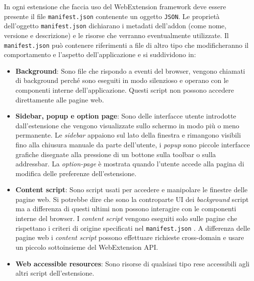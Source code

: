 \documentclass{sapthesis}
\newcommand{\bold}[1]{\textbf{#1}}
\newcommand{\code}[1]{\texttt{#1}}
\newcommand{\manifest}{\code{manifest.json} }
\begin{document}
        In ogni estensione che faccia uso del WebExtension framework deve essere presente il file \manifest contenente 
        un oggetto \code{JSON}. Le proprietà dell'oggetto \manifest dichiarano i metadati dell'addon (come nome, 
        versione e descrizione) e le risorse che verranno eventualmente utilizzate.
        Il \manifest può contenere riferimenti a file di altro tipo che modificheranno il comportamento e l'aspetto
        dell'applicazione e si suddividono in:
        \begin{itemize}
            \item \bold{Background}: Sono file che rispondo a eventi del browser, vengono chiamati di background 
                    perché sono eseguiti in modo silenzioso e operano con le componenti interne dell'applicazione.
                    Questi script non possono accedere direttamente alle pagine web.

            \item \bold{Sidebar, popup e option page}: Sono delle interfacce utente introdotte dall'estensione che
                    vengono visualizzate sullo schermo in modo più o meno permanente. Le \textit{sidebar} appaiono sul lato
                    della finestra e rimangono visibili fino alla chiusura manuale da parte dell'utente, i \textit{popup} sono
                    piccole interfacce grafiche disegnate alla pressione di un bottone sulla toolbar o sulla addressbar.
                    La \textit{option-page} è mostrata quando l'utente accede alla pagina di modifica delle preferenze
                    dell'estensione.

            \item \bold{Content script}: Sono script usati per accedere e manipolare le finestre delle pagine web. Si
                    potrebbe dire che sono la controparte UI dei \textit{background} script ma a differenza di questi
                    ultimi non possono interagire con le componenti interne del browser. I \textit{content script} 
                    vengono eseguiti solo sulle pagine che rispettano i criteri di origine specificati nel \manifest{}.
                    A differenza delle pagine web i \textit{content script} possono effettuare richieste cross-domain e
                    usare un piccolo sottoinsieme del WebExtension API.

            \item \bold{Web accessible resources}: Sono risorse di qualsiasi tipo rese accessibili agli altri script
                    dell'estensione.

        \end{itemize}
\end{document}
